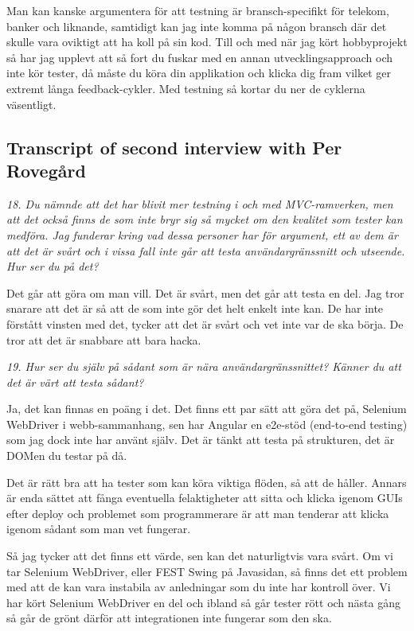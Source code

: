 \documentclass[11pt]{article}
\begin{document}
Man kan kanske argumentera för att testning är bransch-specifikt för telekom, banker och liknande, samtidigt kan jag inte komma på någon bransch där det skulle vara oviktigt att ha koll på sin kod. Till och med när jag kört hobbyprojekt så har jag upplevt att så fort du fuskar med en annan utvecklingsapproach och inte kör tester, då måste du köra din applikation och klicka dig fram vilket ger extremt långa feedback-cykler. Med testning så kortar du ner de cyklerna väsentligt.


\subsection*{Transcript of second interview with Per Rovegård}

\emph{18. Du nämnde att det har blivit mer testning i och med MVC-ramverken, men att det också finns de som inte bryr sig så mycket om den kvalitet som tester kan medföra. Jag funderar kring vad dessa personer har för argument, ett av dem är att det är svårt och i vissa fall inte går att testa användargränssnitt och utseende. Hur ser du på det?}

Det går att göra om man vill. Det är svårt, men det går att testa en del. Jag tror snarare att det är så att de som inte gör det helt enkelt inte kan. De har inte förstått vinsten med det, tycker att det är svårt och vet inte var de ska börja. De tror att det är snabbare att bara hacka.

\emph{19. Hur ser du själv på sådant som är nära användargränssnittet? Känner du att det är värt att testa sådant?}

Ja, det kan finnas en poäng i det. Det finns ett par sätt att göra det på, Selenium WebDriver i webb-sammanhang, sen har Angular en e2e-stöd (end-to-end testing) som jag dock inte har använt själv. Det är tänkt att testa på strukturen, det är DOMen du testar på då.

Det är rätt bra att ha tester som kan köra viktiga flöden, så att de håller. Annars är enda sättet att fånga eventuella felaktigheter att sitta och klicka igenom GUIs efter deploy och problemet som programmerare är att man tenderar att klicka igenom sådant som man vet fungerar.

Så jag tycker att det finns ett värde, sen kan det naturligtvis vara svårt. Om vi tar Selenium WebDriver, eller FEST Swing på Javasidan, så finns det ett problem med att de kan vara instabila av anledningar som du inte har kontroll över. Vi har kört Selenium WebDriver en del och ibland så går tester rött och nästa gång så går de grönt därför att integrationen inte fungerar som den ska.
\end{document}
